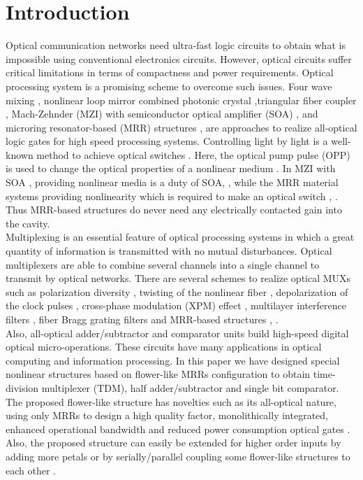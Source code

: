 \documentclass{osa-article}
\begin{document}
\section{Introduction}
\label{}
Optical communication networks need ultra-fast logic circuits to obtain what is impossible using conventional electronics circuits. However, optical circuits suffer critical limitations in terms of compactness and power requirements. Optical processing system is a promising scheme to overcome such issues. Four wave mixing \cite{hu2014all}, nonlinear loop mirror combined photonic crystal \cite{sharma2015numerical},triangular fiber coupler \cite{menezes2012numerical}, Mach-Zehnder (MZI) with semiconductor optical amplifier (SOA) \cite{kotb2017performance}, \cite{kotb2018all} and microring resonator-based (MRR) structures \cite{lalehsimulation}, \cite{rakshit2014micro} are approaches to realize all-optical logic gates for high speed processing systems. Controlling light by light is a well-known method to achieve optical switches \cite{rakshit2013design}. Here, the optical pump pulse (OPP) is used to change the optical properties of a nonlinear medium \cite{wang2012simulative}. In MZI with SOA \cite{dimitriadou2013feasibility}, providing nonlinear media is a duty of SOA, \cite{houbavlis2003soa}, while the MRR material systems providing nonlinearity which is required to make an optical switch \cite{li2012theoretical}, \cite{heebner1999enhanced}. Thus MRR-based structures do never need any electrically contacted gain into the cavity.\\ 
Multiplexing \cite{schwelb2006crosstalk} is an essential feature of optical processing systems in which a great quantity of information is transmitted with no mutual disturbances. Optical multiplexers are able to combine several channels into a single channel to transmit by optical networks. There are several schemes to realize optical MUXs \cite{wu2012proposal} such as polarization diversity \cite{shen2008reconfigurable}, twisting of the nonlinear fiber \cite{xu2011reconfigurable}, depolarization of the clock pulses \cite{ismail2011all}, cross-phase modulation (XPM) effect \cite{lin1999investigation}, multilayer interference filters \cite{roy2014design},  fiber Bragg grating filters \cite{zoiros2005complete} and MRR-based structures \cite{lalehsimulation}, \cite{rakshit2013design}.\\
 Also, all-optical adder/subtractor and comparator units build high-speed digital optical micro-operations. These circuits have many applications in optical computing and information processing. In this paper we have designed special nonlinear structures based on flower-like MRRs configuration \cite{razaghi2016design} to obtain time-division multiplexer (TDM), half adder/subtractor and single bit comparator. The proposed flower-like structure has novelties such as its all-optical nature, using only MRRs to design a high quality factor, monolithically integrated, enhanced operational bandwidth and reduced power consumption optical gates \cite{laleh2019performance}. Also, the proposed structure can easily be extended for higher order inputs by adding more petals or by serially/parallel coupling some flower-like structures to each other \cite{razaghi2016design}.\\
\end{document}
